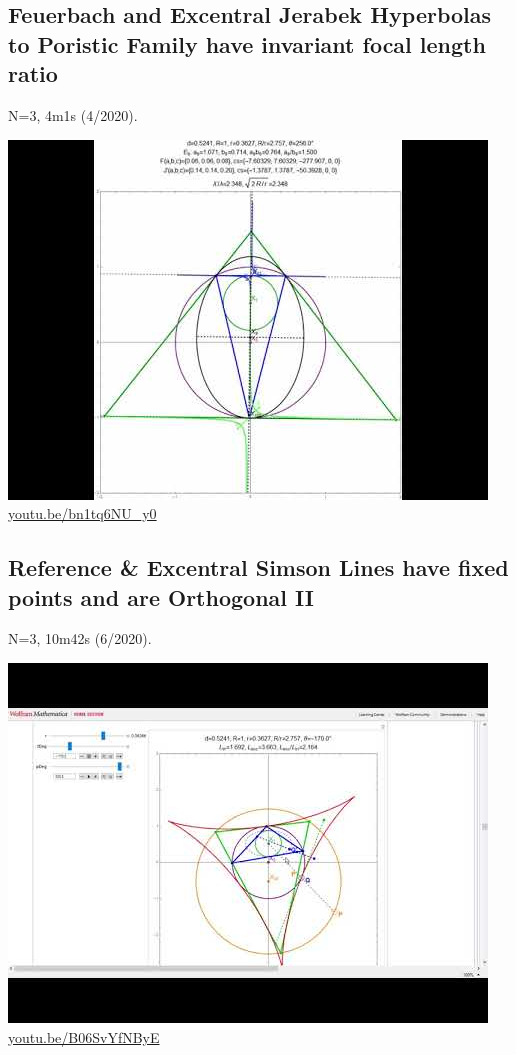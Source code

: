 \documentclass[12pt]{amsart}
\begin{document}
\subsection{Feuerbach and Excentral Jerabek Hyperbolas to Poristic Family have invariant focal length ratio}
\label{vid:bn1tq6NU_y0}
\noindent N=3, 4m1s (4/2020). 
\begin{center}\includegraphics[width=.5\textwidth]{pics/bn1tq6NU_y0.jpg} \\ 
\href{https://youtu.be/bn1tq6NU_y0}{\url{youtu.be/bn1tq6NU\_y0}}\end{center}
% 

\subsection{Reference \& Excentral Simson Lines have fixed points and are Orthogonal II}
\label{vid:B06SvYfNByE}
\noindent N=3, 10m42s (6/2020). 
\begin{center}\includegraphics[width=.5\textwidth]{pics/B06SvYfNByE.jpg} \\ 
\href{https://youtu.be/B06SvYfNByE}{\url{youtu.be/B06SvYfNByE}}\end{center}
% 
\end{document}
